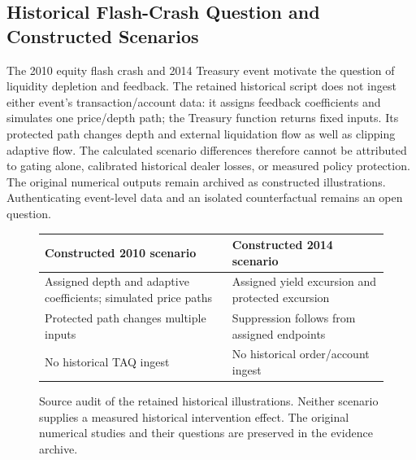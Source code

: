 \documentclass[12pt]{article}
\theoremstyle{definition}
\theoremstyle{remark}
\begin{document}
\subsection{Historical Flash-Crash Question and Constructed Scenarios}
\label{sec:historical_flash_crashes}
The 2010 equity flash crash and 2014 Treasury event motivate the question of liquidity depletion and feedback. The retained historical script does not ingest either event's transaction/account data: it assigns feedback coefficients and simulates one price/depth path; the Treasury function returns fixed inputs. Its protected path changes depth and external liquidation flow as well as clipping adaptive flow. The calculated scenario differences therefore cannot be attributed to gating alone, calibrated historical dealer losses, or measured policy protection. The original numerical outputs remain archived as constructed illustrations. Authenticating event-level data and an isolated counterfactual remains an open question.
\begin{figure}[htbp]\centering
\begin{tabularx}{\textwidth}{XX}\toprule
Constructed 2010 scenario & Constructed 2014 scenario \\\midrule
Assigned depth and adaptive coefficients; simulated price paths & Assigned yield excursion and protected excursion \\
Protected path changes multiple inputs & Suppression follows from assigned endpoints \\
No historical TAQ ingest & No historical order/account ingest \\\bottomrule\end{tabularx}
\caption{Source audit of the retained historical illustrations. Neither scenario supplies a measured historical intervention effect. The original numerical studies and their questions are preserved in the evidence archive.}
\label{fig:equity_flash_crash_taq}\end{figure}
\end{document}
